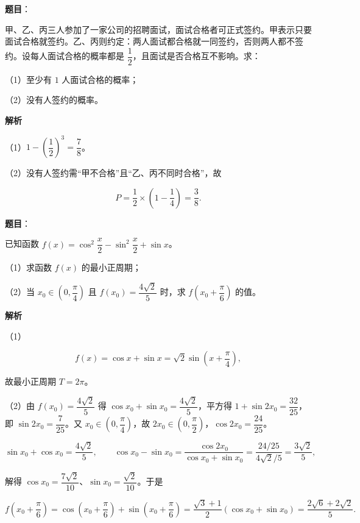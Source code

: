 \begin{answer}

\textbf{题目}：

甲、乙、丙三人参加了一家公司的招聘面试，面试合格者可正式签约。甲表示只要面试合格就签约。乙、丙则约定：两人面试都合格就一同签约，否则两人都不签约。设每人面试合格的概率都是 $\dfrac12$，且面试是否合格互不影响。求：

（1）至少有 $1$ 人面试合格的概率；

（2）没有人签约的概率。

\textbf{解析}

（1）$1-\left(\dfrac12\right)^3=\dfrac78$。

（2）没有人签约需“甲不合格”且“乙、丙不同时合格”，故

\nopagebreak[4]
\[P=\frac12\times\left(1-\frac14\right)=\frac38.\]


\end{answer}
\begin{answer}

\textbf{题目}：

已知函数 $f(x)=\cos^2\dfrac x2-\sin^2\dfrac x2+\sin x$。

（1）求函数 $f(x)$ 的最小正周期；

（2）当 $x_0\in\left(0,\dfrac{\pi}4\right)$ 且 $f(x_0)=\dfrac{4\sqrt2}5$ 时，求 $f\left(x_0+\dfrac{\pi}6\right)$ 的值。

\textbf{解析}

（1）

\nopagebreak[4]
\[f(x)=\cos x+\sin x=\sqrt2\sin\left(x+\frac{\pi}4\right),\]

故最小正周期 $T=2\pi$。

（2）由 $f(x_0)=\dfrac{4\sqrt2}5$ 得 $\cos x_0+\sin x_0=\dfrac{4\sqrt2}5$，平方得 $1+\sin2x_0=\dfrac{32}{25}$，即 $\sin2x_0=\dfrac7{25}$。又 $x_0\in\left(0,\dfrac{\pi}4\right)$，故 $2x_0\in\left(0,\dfrac{\pi}2\right)$，$\cos2x_0=\dfrac{24}{25}$。

\nopagebreak[4]
\[\sin x_0+\cos x_0=\frac{4\sqrt2}5,\qquad \cos x_0-\sin x_0=\frac{\cos2x_0}{\cos x_0+\sin x_0}=\frac{24/25}{4\sqrt2/5}=\frac{3\sqrt2}5,\]

解得 $\cos x_0=\dfrac{7\sqrt2}{10}$、$\sin x_0=\dfrac{\sqrt2}{10}$。于是

\nopagebreak[4]
\[f\left(x_0+\frac{\pi}6\right)=\cos\left(x_0+\frac{\pi}6\right)+\sin\left(x_0+\frac{\pi}6\right)=\frac{\sqrt3+1}2(\cos x_0+\sin x_0)=\frac{2\sqrt6+2\sqrt2}5.\]


\end{answer}
